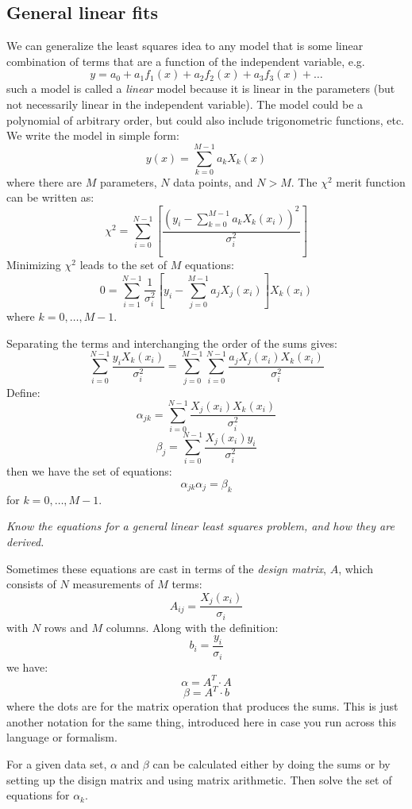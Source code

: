 \documentclass[12pt]{article}
\begin{document}
\subsection{General linear fits}
We can generalize the least squares idea to any model that is some linear
combination of terms that are a function of the independent variable,
e.g.
$$ y = a_0 + a_1f_1(x) + a_2f_2(x) + a_3f_3(x) + \ldots $$
such a model is called a \emph{linear} model because it is linear
in the parameters (but not necessarily linear in the independent
variable). The model could be a polynomial of arbitrary order, but
could also include trigonometric functions, etc. We write the model
in simple form:
$$ y(x) = \sum_{k=0}^{M-1}a_kX_k(x) $$
where there are $M$ parameters, $N$ data points, and $N>M$.
The $\chi^2$ merit function can be written as:
$$ \chi^2 = \sum_{i=0}^{N-1} \left[
    \frac{(y_i - \sum_{k=0}^{M-1} a_{k}X_{k}(x_{i}))^{2}}
    {\sigma_{i}^{2}} \right] $$
Minimizing $\chi^2$ leads to the set of $M$ equations:
$$ 0 = \sum_{i=1}^{N-1}\frac{1}{\sigma_i^2}
\left[y_{i} - \sum_{j=0}^{M-1}a_{j}X_{j}(x_{i})\right]X_{k}(x_{i}) $$
where $k=0,\ldots,M-1$.

Separating the terms and interchanging the order of the sums gives:
$$\sum_{i=0}^{N-1}\frac{y_{i}X_{k}(x_{i})}{\sigma_{i}^{2}} =
\sum_{j=0}^{M-1}\sum_{i=0}^{N-1}\frac{a_{j}X_{j}(x_{i})X_{k}(x_{i})}{\sigma_{i}^{2}}  $$
Define:
$$ \alpha_{jk} = \sum_{i=0}^{N-1}\frac{X_{j}(x_{i})X_{k}(x_{i})}{\sigma_{i}^{2}}$$
$$ \beta_{j} = \sum_{i=0}^{N-1}\frac{X_{j}(x_{i})y_{i}}{\sigma_{i}^{2}}$$
then we have the set of equations:
$$ \alpha_{jk}\alpha_{j} = \beta_{k} $$
for $k=0,\ldots,M-1$.

\colorbox{hl}{\parbox{0.9\textwidth}
{\emph{Know the equations for a general linear least squares
problem, and how they are derived.}}}

Sometimes these equations are cast in terms of the \emph{design matrix},
$A$, which consists of $N$ measurements of $M$ terms:
$$ A_{ij} = \frac{X_j(x_i)}{\sigma_i}  $$
with $N$ rows and $M$ columns. Along with the definition:
$$ b_i = \frac{y_i}{\sigma_i} $$
we have:
$$ \alpha = A^T \cdot A $$
$$ \beta = A^T \cdot b $$
where the dots are for the matrix operation that produces the sums.
This is just another notation for the same thing, introduced here in
case you run across this language or formalism.

For a given data set, $\alpha$ and $\beta$ can be calculated either
by doing the sums or by setting up the disign matrix and using matrix
arithmetic. Then solve the set of equations for $\alpha_k$.
\end{document}
